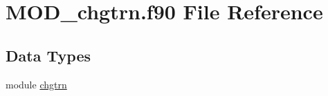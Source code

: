 \hypertarget{MOD__chgtrn_8f90}{\section{M\-O\-D\-\_\-chgtrn.\-f90 File Reference}
\label{MOD__chgtrn_8f90}
}
\subsection*{Data Types}
\begin{DoxyCompactItemize}
\item 
module \hyperlink{classchgtrn}{chgtrn}
\end{DoxyCompactItemize}
